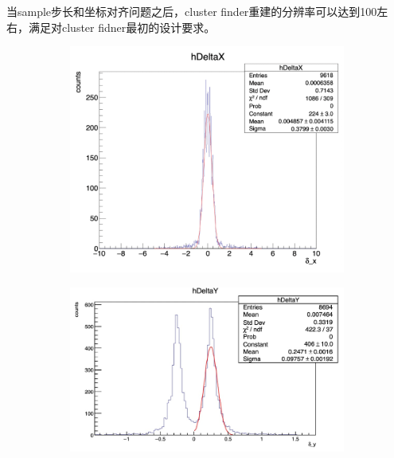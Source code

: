 当sample步长和坐标对齐问题之后，cluster finder重建的分辨率可以达到100\mum 左右，满足对cluster fidner最初的设计要求。

\begin{figure}[htb]
    \centering
    \begin{subfigure}[b]{0.24\textwidth}
        \centering
        \includegraphics[width=\textwidth,clip]{figures/Chapter3/Resolution_1.png}
        \caption{}
        \label{fig:Resolution_1}
    \end{subfigure}
    \begin{subfigure}[b]{0.24\textwidth}
        \centering
        \includegraphics[width=\textwidth,clip]{figures/Chapter3/Resolution_2.png}
        \caption{}
        \label{fig:Resolution_2}
    \end{subfigure}

\end{figure}
